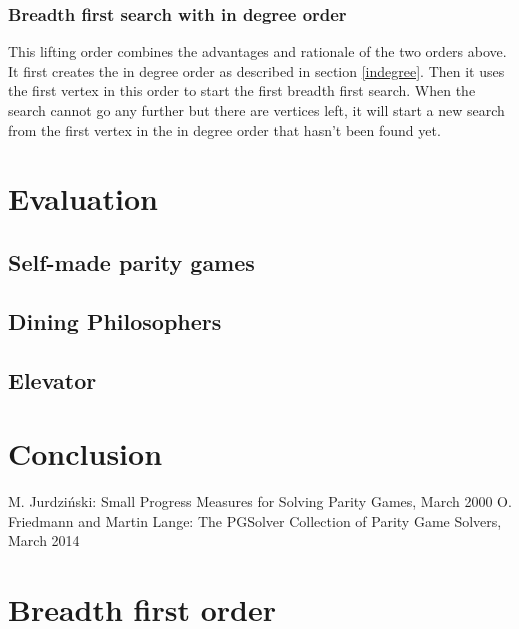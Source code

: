 \documentclass[10pt,a4paper]{article}
\begin{document}
\subsubsection{Breadth first search with in degree order}
This lifting order combines the advantages and rationale of the two orders above. It first creates the in degree order as described in section \ref{indegree}. Then it uses the first vertex in this order to start the first breadth first search. When the search cannot go any further but there are vertices left, it will start a new search from the first vertex in the in degree order that hasn't been found yet.

\section{Evaluation}\label{eval}

\subsection{Self-made parity games}

\subsection{Dining Philosophers}

\subsection{Elevator}


\section{Conclusion}\label{conc}


\begin{thebibliography}{9}
 M. Jurdzi\'{n}ski: Small Progress Measures for Solving Parity Games, March 2000
 O. Friedmann and Martin Lange: The PGSolver Collection of Parity Game Solvers, March 2014
\end{thebibliography}


\newpage
\appendix

\section{Breadth first order}\label{appendix:bfs}
\end{document}
